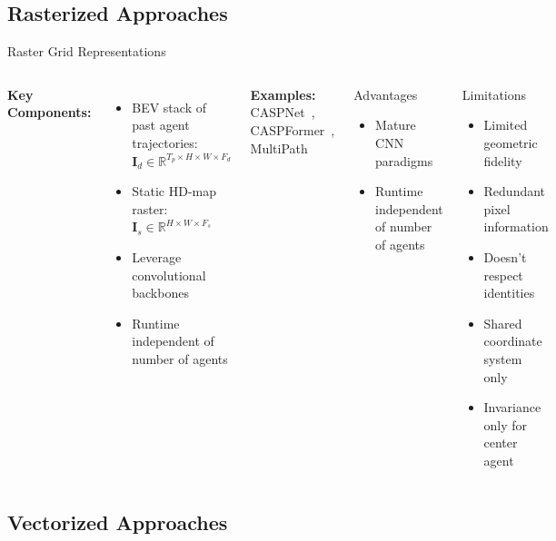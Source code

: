 \documentclass[10pt,aspectratio=169]{beamer}
\begin{document}
\subsection{Rasterized Approaches}

\begin{frame}{Raster Grid Representations}
\begin{columns}[T]
\textbf{Key Components:}
\begin{itemize}
    \item BEV stack of past agent trajectories: $\mathbf{I}_d \in \mathbb{R}^{T_p \times H \times W \times F_d}$
    \item Static HD-map raster: $\mathbf{I}_s \in \mathbb{R}^{H \times W \times F_s}$
    \item Leverage convolutional backbones
    \item Runtime independent of number of agents
\end{itemize}

\textbf{Examples:} CASPNet~\cite{caspnetSchäfer2022}, CASPFormer~\cite{caspformerYadav2024}, MultiPath~\cite{chai2019multipath}

\begin{block}{Advantages}
\begin{itemize}
    \item Mature CNN paradigms
    \item Runtime independent of number of agents
\end{itemize}
\end{block}

\begin{alertblock}{Limitations~\cite{gao2020vectornet}}
\begin{itemize}
    \item Limited geometric fidelity
    \item Redundant pixel information
    \item Doesn't respect identities
    \item Shared coordinate system only
    \item Invariance only for center agent
\end{itemize}
\end{alertblock}
\end{columns}
\end{frame}

\subsection{Vectorized Approaches}
\end{document}
